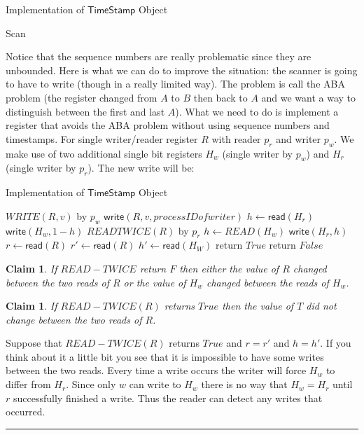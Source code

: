 \documentclass[twoside]{article}
\newtheorem{claim}[theorem]{Claim}
\newenvironment{proof}{{\bf Proof:}}{\hfill\rule{2mm}{2mm}}
\newcommand\readF{\mathsf{read}}
\newcommand\writeF{\mathsf{write}}
\newcommand\timestamp{\mathsf{TimeStamp}}
\begin{document}
\begin{algorithm}
	\caption{Implementation of $\timestamp$ Object}
    \label{pseudocode:timestamp}
    \begin{algorithmic}[1]
	\State Scan		
	\end{algorithmic}
\end{algorithm}

Notice that the sequence numbers are really problematic since they are unbounded. Here is what we can do to improve the situation: the scanner is going to have to write (though in a really limited way). The problem is call the ABA problem (the register changed from $A$ to $B$ then back to $A$ and we want a way to distinguish between the first and last $A$). What we need to do is implement a register that avoids the ABA problem without using sequence numbers and timestamps. For single writer/reader register $R$ with reader $p_r$ and writer $p_w$.  We make use of two additional single bit registers $H_w$ (single writer by $p_w$) and $H_r$ (single writer by $p_r$). The new write will be:

\begin{algorithm}
	\caption{Implementation of $\timestamp$ Object}
    \label{pseudocode:register}
    \begin{algorithmic}[1]
	\State $WRITE(R, v)$ by $p_w$
	\State $\writeF(R, v, process ID of writer)$
	\State $h \leftarrow \readF(H_r)$
	\State $\writeF(H_w, 1-h)$
	\State
	\State $READTWICE(R)$ by $p_r$
	\State $h \leftarrow READ(H_w)$
	\State $\writeF(H_r, h)$
	\State $r \leftarrow \readF(R)$
	\State $r' \leftarrow \readF(R)$
	\State $h' \leftarrow \readF(H_W)$
		\State return $True$
	\Else
		\State return $False$
	\EndIf		
	\end{algorithmic}
\end{algorithm}

\begin{claim}
If $READ-TWICE$ return $F$ then either the value of $R$ changed between the two reads of $R$ or the value of $H_w$ changed between the reads of $H_w$.
\end{claim}

\begin{claim}
If $READ-TWICE(R)$ returns $True$ then the value of $T$ did not change between the two reads of $R$.
\end{claim}
\begin{proof}
Suppose that $READ-TWICE(R)$ returns $True$ and $r = r'$ and $h = h'$. If you think about it a little bit you see that it is impossible to have some writes between the two reads. Every time a write occurs the writer will force $H_w$ to differ from $H_r$. Since only $w$ can write to $H_w$ there is no way that $H_w = H_r$ until $r$ successfully finished a write. Thus the reader can detect any writes that occurred.  
\end{proof}
\end{document}
